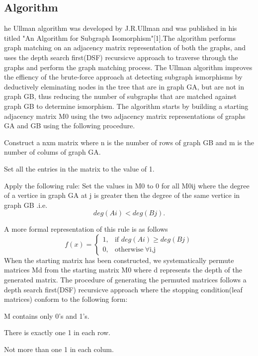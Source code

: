 \subsection{Algorithm}
he Ullman algorithm was developed by J.R.Ullman and was published in his titled "An Algorithm for Subgraph Isomorphism"[1].The algorithm performs graph matching on an adjacency matrix representation of both the graphs, and uses the depth search first(DSF) recursicve approach to traverse through the graphs and perform
the graph matching process. The Ullman algorithm improves the effiency of the brute-force approach at detecting subgraph ismorphisms by deductively eleminating nodes in the tree that are in graph G{\tiny A}, but are not in graph G{\tiny B}, thus reducing the number of subgraphs that are matched against graph G{\tiny B}
to determine ismorphism.\newline\newline
The algorithm starts by building a starting adjacency matrix M0 using the two adjacency matrix representations of graphs G{\tiny A} and G{\tiny B} using the following procedure.
\begin{myEnumerate}
\item Construct a nxm matrix where n is the number of rows of graph G{\tiny B} and m is the number of colums of graph G{\tiny A}.
\item Set all the entries in the matrix to the value of 1.
\item Apply the following rule:
	Set the values in M0 to 0 for all M0ij where the degree of a vertice in graph G{\tiny A} at j is greater then the degree of the same vertice in graph G{\tiny B} .i.e. 
	\begin{equation}
		deg(Ai) < deg(Bj). 
	\end{equation}

\end{myEnumerate}
	A more formal representation of this rule is as follows
	\[
		f(x)= 
			\begin{cases}
				1,& \text{if } deg(Ai)\geq deg(Bj)\\ 
				0,              & \text{otherwise}\   \forall \text{i,j}
			\end{cases}
	\]
When the starting matrix has been constructed, we systematically permute matrices Md from the starting matrix M0 where d represents the depth of the generated matrix. The procedure of 
generating the permuted matrices follows a depth search first(DSF) recursicve approach where the stopping condition(leaf matrices) conform to the following form:
\begin{myEnumerate}
\item M contains only 0's and 1's.
\item There is exactly one 1 in each row.
\item Not more than one 1 in each colum.
\end{myEnumerate}

